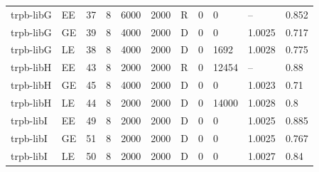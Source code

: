 \begin{longtable}[c]{lllllllllll}
trpb-libG & EE & 37 & 8 & 6000 & 2000 & R & 0 & 0 & -- & 0.852 \\
trpb-libG & GE & 39 & 8 & 4000 & 2000 & D & 0 & 0 & 1.0025 & 0.717 \\
trpb-libG & LE & 38 & 8 & 4000 & 2000 & D & 0 & 1692 & 1.0028 & 0.775 \\
trpb-libH & EE & 43 & 8 & 2000 & 2000 & R & 0 & 12454 & -- & 0.88 \\
trpb-libH & GE & 45 & 8 & 4000 & 2000 & D & 0 & 0 & 1.0023 & 0.71 \\
trpb-libH & LE & 44 & 8 & 2000 & 2000 & D & 0 & 14000 & 1.0028 & 0.8 \\
trpb-libI & EE & 49 & 8 & 2000 & 2000 & D & 0 & 0 & 1.0025 & 0.885 \\
trpb-libI & GE & 51 & 8 & 2000 & 2000 & D & 0 & 0 & 1.0025 & 0.767 \\
trpb-libI & LE & 50 & 8 & 2000 & 2000 & D & 0 & 0 & 1.0027 & 0.84 \\
\end{longtable}
\endgroup
\begingroup
\scriptsize
\setlength{\tabcolsep}{3pt}
